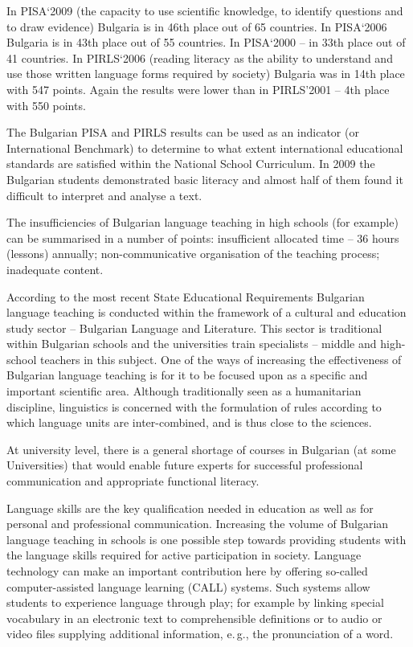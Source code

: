 \documentclass[]{../../metanetpaper}
\begin{document}
\begin{multicols}{2}
In PISA‘2009 \cite{oecd} (the capacity to use scientific knowledge, to identify questions and to draw evidence) Bulgaria is in 46th place out of 65 countries. In PISA‘2006 Bulgaria is in 43th place out of 55 countries. In PISA‘2000 -- in 33th place out of 41 countries. 
In PIRLS‘2006 \cite{nces} (reading literacy as the ability to understand and use those written language forms required by society) Bulgaria was in 14th place with 547 points. Again the results were lower than in PIRLS’2001 -- 4th place with 550 points.

The Bulgarian PISA and PIRLS results can be used as an indicator (or International Benchmark) to determine to what extent international educational standards are satisfied within the National School Curriculum. In 2009 the Bulgarian students demonstrated basic literacy and almost half of them found it difficult to interpret and analyse a text. 

The insufficiencies of Bulgarian language teaching in high schools (for example) can be summarised in a number of points: insufficient allocated time – 36 hours (lessons) annually; non-communicative organisation of the teaching process; inadequate content.


According to the most recent State Educational Requirements Bulgarian language teaching is conducted within the framework of a cultural and education study sector -- Bulgarian Language and Literature. This sector is traditional within Bulgarian schools and the universities train specialists -- middle and high-school teachers in this subject. One of the ways of increasing the effectiveness of Bulgarian language teaching is for it to be focused upon as a specific and important scientific area. Although traditionally seen as a humanitarian discipline, linguistics is concerned with the formulation of rules according to which language units are inter-combined, and is thus close to the sciences. 

At university level, there is a general shortage of courses in Bulgarian (at some Universities) that would enable future experts for successful professional communication and appropriate functional literacy.

Language skills are the key qualification needed in education as well as for personal and professional communication. Increasing the volume of Bulgarian language teaching in schools is one possible step towards providing students with the language skills required for active participation in society. Language technology can make an important contribution here by offering so-called computer-assisted language learning (CALL) systems. Such systems allow students to experience language through play; for example by linking special vocabulary in an electronic text to comprehensible definitions or to audio or video files supplying additional information, e.\,g., the pronunciation of a word. 


\end{multicols}
\end{document}

